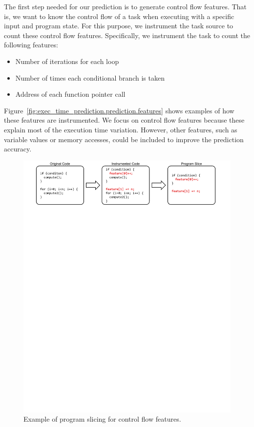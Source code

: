 The first step needed for our prediction is to generate control flow features.
That is, we want to know the control flow of a task when executing with a
specific input and program state.  For this purpose, we instrument the task
source to count these control flow features.  Specifically, we instrument the
task to count the following features:
\begin{itemize}
  \item Number of iterations for each loop
  \item Number of times each conditional branch is taken
  \item Address of each function pointer call
\end{itemize}
Figure~\ref{fig:exec_time_prediction.prediction.features} shows examples of how
these features are instrumented.  We focus on control flow features because
these explain most of the execution time variation. However, other features,
such as variable values or memory accesses, could be included to improve the
prediction accuracy.

\begin{figure}
  \begin{center}
    \includegraphics{exec_time_prediction/figs/code_transformations.pdf}
    \caption{Example of program slicing for control flow features.}
    \label{fig:exec_time_prediction.prediction.code_transformations}
  \end{center}
\end{figure}


